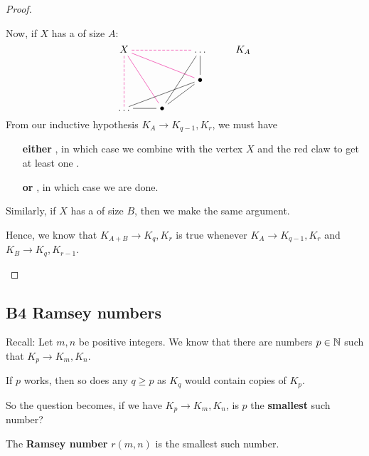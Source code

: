 \documentclass[12pt]{article}
\begin{document}
\begin{proof}
\begin{enumerate}[align=left]
        Now, if $X$ has a  of size $A$:
        \[\begin{tikzcd}[ampersand replacement=\&,cramped]
            X \&\& \dots \& {K_A} \\
            \&\& \bullet \\
            \dots \& \bullet
            \arrow[color=magenta, dashed, no head, from=1-1, to=1-3]
            \arrow[color=magenta, no head, from=1-1, to=2-3]
            \arrow[color=magenta, no head, from=1-1, to=3-2]
            \arrow[color=magenta, dashed, no head, from=1-1, to=3-1]
            \arrow[no head, from=1-3, to=2-3]
            \arrow[no head, from=1-3, to=3-2]
            \arrow[no head, from=2-3, to=3-2]
            \arrow[no head, from=3-1, to=3-2]
            \arrow[no head, from=3-1, to=2-3]
        \end{tikzcd}\]
        From our inductive hypothesis $K_A\to K_{q-1},K_r$, we must have \begin{itemize}[align=left]
            \item[\textbf{either}] , in which case we combine with the vertex $X$ and the red claw to get at least one .
            \item[\textbf{or}] , in which case we are done. 
        \end{itemize}
        Similarly, if $X$ has a  of size $B$, then we make the same argument.
        \vspace{0.2in}
        
        Hence, we know that $K_{A+B}\to K_q,K_r$ is true whenever $K_A\to K_{q-1},K_r$ and $K_B\to K_{q},K_{r-1}$.
    \end{enumerate}
\end{proof}

\subsection{B4 Ramsey numbers}
Recall: Let $m,n$ be positive integers. We know that there are numbers $p\in \mathbb{N}$ such that $K_p\to K_m,K_n$.

\rmk If $p$ works, then so does any $q\geq p$ as $K_q$ would contain copies of $K_p$.

So the question becomes, if we have $K_p\to K_m,K_n$, is $p$ the \textbf{smallest} such number?

 The \textbf{Ramsey number} $r(m,n)$ is the smallest such number.
\end{document}
